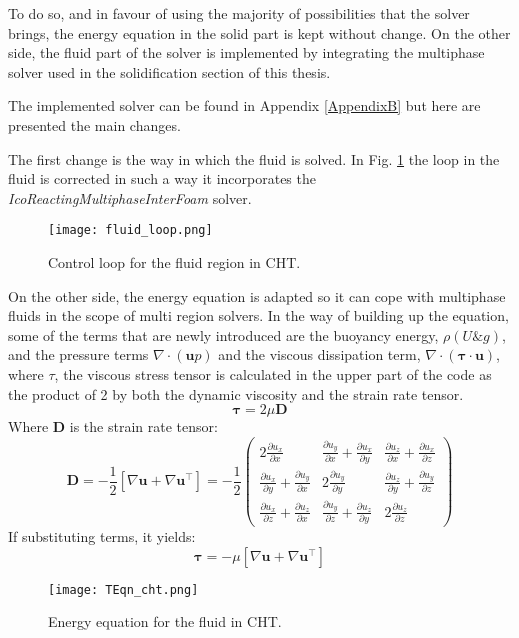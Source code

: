 \noindent To do so, and in favour of using the majority of possibilities that the solver brings, the energy equation in the solid part is kept without change. On the other side, the fluid part of the solver is implemented by integrating the multiphase solver used in the solidification section of this thesis.  

\noindent The implemented solver can be found in Appendix \ref{AppendixB} but here are presented the main changes.

\noindent The first change is the way in which the fluid is solved. In Fig. \ref{4.3fig} the loop in the fluid is corrected in such a way it incorporates the \textit{IcoReactingMultiphaseInterFoam} solver. 

\begin{figure}[h!]
	\centering
	\texttt{[image: fluid\_loop.png]}	
	\caption{Control loop for the fluid region in CHT.}
	\label{4.3fig}
\end{figure} 

\noindent On the other side, the energy equation is adapted so it can cope with multiphase fluids in the scope of multi region solvers. In the way of building up the equation, some of the terms that are newly introduced are the buoyancy energy, $\rho(U\&g)$, and the pressure terms $\nabla \cdot (\textbf{u}p)$ and the viscous dissipation term, $\nabla \cdot (\boldsymbol{\tau} \cdot \textbf{u})$, where $\tau$, the viscous stress tensor is calculated in the upper part of the code as the product of 2 by both the dynamic viscosity and the strain rate tensor.
\begin{equation}
\boldsymbol{\tau}=2 \mu \mathbf{D}
\end{equation}
Where \textbf{D} is the strain rate tensor:
\begin{equation}
	\mathbf{D}=-\frac{1}{2}\left[\nabla \mathbf{u}+\nabla \mathbf{u}^{\top}\right]=-\frac{1}{2}\left(\begin{array}{ccc}
	2 \frac{\partial u_{x}}{\partial x} & \frac{\partial u_{y}}{\partial x}+\frac{\partial u_{x}}{\partial y} & \frac{\partial u_{z}}{\partial x}+\frac{\partial u_{x}}{\partial z} \\
	\frac{\partial u_{x}}{\partial y}+\frac{\partial u_{y}}{\partial x} & 2 \frac{\partial u_{y}}{\partial y} & \frac{\partial u_{z}}{\partial y}+\frac{\partial u_{y}}{\partial z} \\
	\frac{\partial u_{x}}{\partial z}+\frac{\partial u_{z}}{\partial x} & \frac{\partial u_{y}}{\partial z}+\frac{\partial u_{z}}{\partial y} & 2 \frac{\partial u_{z}}{\partial z}
	\end{array}\right)
	\label{4.7}
\end{equation}
If substituting terms, it yields:
\begin{equation}
	\boldsymbol{\tau}=-\mu\left[\nabla \mathbf{u}+\nabla \mathbf{u}^{\top}\right]
	\label{4.8}
\end{equation}
\begin{figure}[h!]
	\centering
	\texttt{[image: TEqn\_cht.png]}	
	\label{4.4fig}
	\caption{Energy equation for the fluid in CHT.}
\end{figure} 

